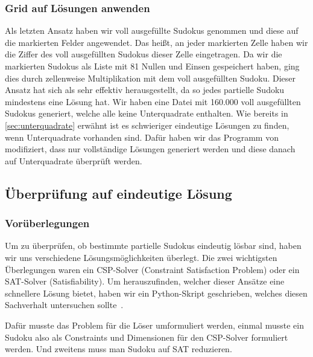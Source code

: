 \subsubsection{Grid auf Lösungen anwenden}
Als letzten Ansatz haben wir voll ausgefüllte Sudokus genommen und diese auf die markierten Felder angewendet.
Das heißt, an jeder markierten Zelle haben wir die Ziffer des voll ausgefüllten Sudokus dieser Zelle eingetragen.
Da wir die markierten Sudokus als Liste mit 81 Nullen und Einsen gespeichert haben,
ging dies durch zellenweise Multiplikation mit dem voll ausgefüllten Sudoku.
Dieser Ansatz hat sich als sehr effektiv herausgestellt, da so jedes partielle Sudoku mindestens eine Lösung hat.
Wir haben eine Datei mit 160.000 voll ausgefüllten Sudokus generiert, welche alle keine Unterquadrate enthalten.
Wie bereits in \cref{sec:unterquadrate} erwähnt ist es schwieriger eindeutige Lösungen zu finden, wenn Unterquadrate vorhanden sind.
Dafür haben wir das Programm von~\cite{stunmuffin_sudoku_generator_2025} modifiziert, dass nur vollständige Lösungen generiert werden
und diese danach auf Unterquadrate überprüft werden.


\subsection{Überprüfung auf eindeutige Lösung}
\subsubsection{Vorüberlegungen}
Um zu überprüfen, ob bestimmte partielle Sudokus eindeutig lösbar sind, haben wir uns verschiedene Lösungsmöglichkeiten überlegt.
Die zwei wichtigsten Überlegungen waren ein CSP-Solver (Constraint Satisfaction Problem) oder ein SAT-Solver (Satisfiability).
Um herauszufinden, welcher dieser Ansätze eine schnellere Lösung bietet, haben wir ein Python-Skript geschrieben, welches diesen Sachverhalt untersuchen sollte~\cite{sat_csp_comparison}.

Dafür musste das Problem für die Löser umformuliert werden, einmal musste ein Sudoku also als Constraints und Dimensionen für den CSP-Solver formuliert werden.
Und zweitens muss man Sudoku auf SAT reduzieren.

